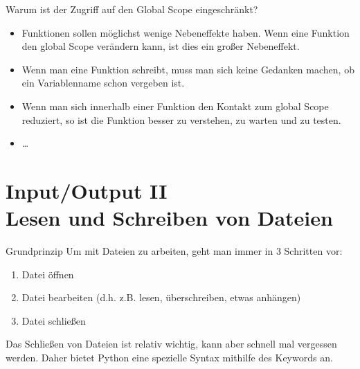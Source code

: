 \begin{frame}
	
\begin{block}{Warum ist der Zugriff auf den Global Scope eingeschränkt?}
	\pause 
	\begin{itemize}[<+->]
		\item Funktionen sollen möglichst wenige Nebeneffekte haben. Wenn eine Funktion den global Scope verändern kann, ist dies ein großer Nebeneffekt. 
		\item Wenn man eine Funktion schreibt, muss man sich keine Gedanken machen, ob ein Variablenname schon vergeben ist. 
		\item Wenn man sich innerhalb einer Funktion den Kontakt zum global Scope reduziert, so ist die Funktion besser zu verstehen, zu warten und zu testen. 
		\item \dots
	\end{itemize}
\end{block}
	
	
\end{frame}


\section{Input/Output II \\ \footnotesize Lesen und Schreiben von Dateien}

\begin{frame}
	
\begin{block}{Grundprinzip}
\vspace{2pt}
Um mit Dateien zu arbeiten, geht man immer in 3 Schritten vor:
\pause 
\begin{enumerate}
	\item<2-> Datei öffnen 
	\item<3-> Datei bearbeiten (d.h. z.B. lesen, überschreiben, etwas anhängen)
	\item<4-> Datei schließen
\end{enumerate}
\pause \pause \pause
Das Schließen von Dateien ist relativ wichtig, kann aber schnell mal vergessen werden. Daher bietet Python eine spezielle Syntax mithilfe des Keywords  an. 
\end{block}
\end{frame}


